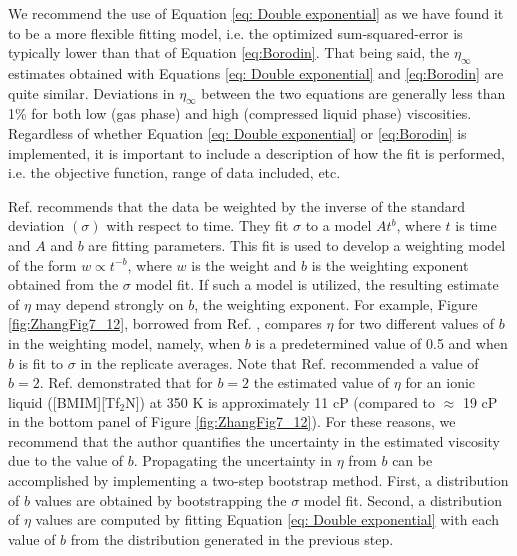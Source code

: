 \documentclass[9pt,bestpractices]{livecoms}
\begin{document}
We recommend the use of Equation \ref{eq: Double exponential} as we have found it to be a more flexible fitting model, i.e. the optimized sum-squared-error is typically lower than that of Equation \ref{eq:Borodin}. That being said, the $\eta_{\infty}$ estimates obtained with Equations \ref{eq: Double exponential} and \ref{eq:Borodin} are quite similar. Deviations in $\eta_{\infty}$ between the two equations are generally less than 1\% for both low (gas phase) and high (compressed liquid phase) viscosities. Regardless of whether Equation \ref{eq: Double exponential} or \ref{eq:Borodin} is implemented, it is important to include a description of how the fit is performed, i.e. the objective function, range of data included, etc.

Ref. \cite{Zhang2015} recommends that the data be weighted by the inverse of the standard deviation $(\sigma)$ with respect to time. They fit $\sigma$ to a model $A t^b$, where $t$ is time and $A$ and $b$ are fitting parameters. This fit is used to develop a weighting model of the form $w \propto t^{-b}$, where $w$ is the weight and $b$ is the weighting exponent obtained from the $\sigma$ model fit. If such a model is utilized, the resulting estimate of $\eta$ may depend strongly on $b$, the weighting exponent. For example, Figure \ref{fig:ZhangFig7_12}, borrowed from Ref. \cite{Zhang2015}, compares $\eta$ for two different values of $b$ in the weighting model, namely, when $b$ is a predetermined value of 0.5 and when $b$ is fit to $\sigma$ in the replicate averages. Note that Ref. \cite{ReyCastro2006} recommended a value of $b=2$. Ref. \cite{Zhang2015} demonstrated that for $b=2$ the estimated value of $\eta$ for an ionic liquid ([BMIM][Tf$_2$N]) at 350 K is approximately 11 cP (compared to $\approx$ 19 cP in the bottom panel of Figure \ref{fig:ZhangFig7_12}). For these reasons, we recommend that the author quantifies the uncertainty in the estimated viscosity due to the value of $b$. Propagating the uncertainty in $\eta$ from $b$ can be accomplished by implementing a two-step bootstrap method. First, a distribution of $b$ values are obtained by bootstrapping the $\sigma$ model fit. Second, a distribution of $\eta$ values are computed by fitting Equation \ref{eq: Double exponential} with each value of $b$ from the distribution generated in the previous step.

\end{document}
